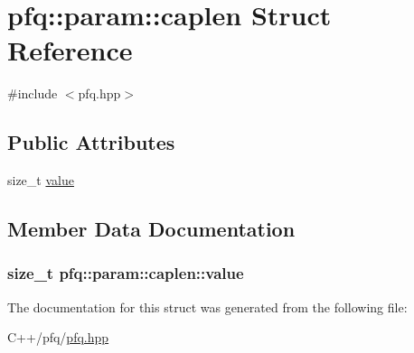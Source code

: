 \hypertarget{structpfq_1_1param_1_1caplen}{\section{pfq\+:\+:param\+:\+:caplen Struct Reference}
\label{structpfq_1_1param_1_1caplen}
}


{\ttfamily \#include $<$pfq.\+hpp$>$}

\subsection*{Public Attributes}
\begin{DoxyCompactItemize}
\item 
size\+\_\+t \hyperlink{structpfq_1_1param_1_1caplen_ad706d73fbbd8342fea36e920253aaa02}{value}
\end{DoxyCompactItemize}


\subsection{Member Data Documentation}
\hypertarget{structpfq_1_1param_1_1caplen_ad706d73fbbd8342fea36e920253aaa02}{
\subsubsection[{value}]{\setlength{\rightskip}{0pt plus 5cm}size\+\_\+t pfq\+::param\+::caplen\+::value}}\label{structpfq_1_1param_1_1caplen_ad706d73fbbd8342fea36e920253aaa02}


The documentation for this struct was generated from the following file\+:\begin{DoxyCompactItemize}
\item 
C++/pfq/\hyperlink{pfq_8hpp}{pfq.\+hpp}\end{DoxyCompactItemize}
